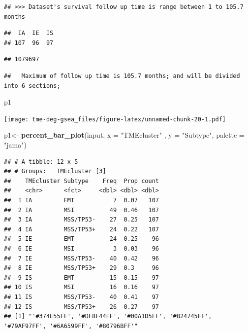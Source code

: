 \documentclass[
  12pt,
]{book}
\newenvironment{Shaded}{\begin{snugshade}}{\end{snugshade}}
\newcommand{\AttributeTok}[1]{\textcolor[rgb]{0.13,0.29,0.53}{#1}}
\newcommand{\FunctionTok}[1]{\textcolor[rgb]{0.13,0.29,0.53}{\textbf{#1}}}
\newcommand{\NormalTok}[1]{#1}
\newcommand{\OtherTok}[1]{\textcolor[rgb]{0.56,0.35,0.01}{#1}}
\newcommand{\StringTok}[1]{\textcolor[rgb]{0.31,0.60,0.02}{#1}}
\begin{document}
\begin{verbatim}
## >>> Dataset's survival follow up time is range between 1 to 105.7 months
\end{verbatim}

\begin{verbatim}
##  IA  IE  IS 
## 107  96  97
\end{verbatim}

\begin{verbatim}
## 1079697
\end{verbatim}

\begin{verbatim}
##   Maximum of follow up time is 105.7 months; and will be divided into 6 sections;
\end{verbatim}

\begin{Shaded}
\begin{Highlighting}[]
\NormalTok{p1}
\end{Highlighting}
\end{Shaded}

\texttt{[image: tme-deg-gsea\_files/figure-latex/unnamed-chunk-20-1.pdf]}

\begin{Shaded}
\begin{Highlighting}[]
\NormalTok{p1}\OtherTok{\textless{}{-}} \FunctionTok{percent\_bar\_plot}\NormalTok{(input, }\AttributeTok{x =} \StringTok{"TMEcluster"}\NormalTok{ , }\AttributeTok{y =} \StringTok{"Subtype"}\NormalTok{, }\AttributeTok{palette =} \StringTok{"jama"}\NormalTok{)}
\end{Highlighting}
\end{Shaded}

\begin{verbatim}
## # A tibble: 12 x 5
## # Groups:   TMEcluster [3]
##    TMEcluster Subtype    Freq  Prop count
##    <chr>      <fct>     <dbl> <dbl> <dbl>
##  1 IA         EMT           7  0.07   107
##  2 IA         MSI          49  0.46   107
##  3 IA         MSS/TP53-    27  0.25   107
##  4 IA         MSS/TP53+    24  0.22   107
##  5 IE         EMT          24  0.25    96
##  6 IE         MSI           3  0.03    96
##  7 IE         MSS/TP53-    40  0.42    96
##  8 IE         MSS/TP53+    29  0.3     96
##  9 IS         EMT          15  0.15    97
## 10 IS         MSI          16  0.16    97
## 11 IS         MSS/TP53-    40  0.41    97
## 12 IS         MSS/TP53+    26  0.27    97
## [1] "'#374E55FF', '#DF8F44FF', '#00A1D5FF', '#B24745FF', '#79AF97FF', '#6A6599FF', '#80796BFF'"
\end{verbatim}
\end{document}

